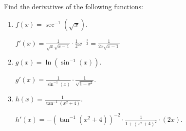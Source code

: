 \documentclass[nooutcomes]{ximera}
\begin{document}
\begin{problem}
Find the derivatives of the following functions:
	\begin{enumerate}
	
	\item  $f(x) = \sec^{-1} (\sqrt{x})$.
		\begin{freeResponse}
		$f'(x) = \frac{1}{\sqrt{x} \sqrt{x - 1}} \cdot \frac{1}{2} x^{-\frac{1}{2}} = \frac{1}{2x\sqrt{x-1}}$
		\end{freeResponse}
		
		
		
	\item  $g(x) = \ln (\sin^{-1}(x))$.
		\begin{freeResponse}
		$g'(x) = \frac{1}{\sin^{-1}(x)} \cdot \frac{1}{\sqrt{1-x^2}}$.
		\end{freeResponse}
		
		
		
	\item  $h(x) = \frac{1}{\tan^{-1}(x^2 + 4)}$.  
		\begin{freeResponse}
		$h'(x) = - \left( \tan^{-1}(x^2 + 4) \right)^{-2} \cdot \frac{1}{1 + (x^2 + 4)^2} \cdot (2x)$.
		\end{freeResponse}
		
		
		
	\end{enumerate}
		
		
\end{problem}
\end{document}
